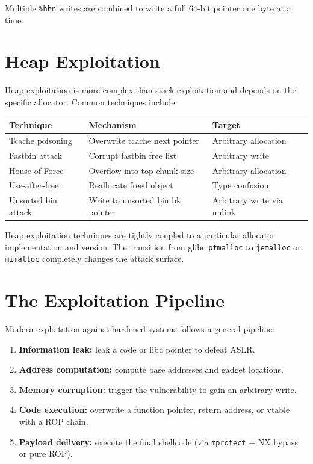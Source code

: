 Multiple \texttt{\%hhn} writes are combined to write a full 64-bit pointer one byte at a time.

\section{Heap Exploitation}

Heap exploitation is more complex than stack exploitation and depends on the specific allocator. Common techniques include:

\begin{longtable}{p{3.5cm}p{5cm}p{4cm}}
	\toprule
	\textbf{Technique}  & \textbf{Mechanism}               & \textbf{Target}            \\
	\midrule
	Tcache poisoning    & Overwrite tcache next pointer    & Arbitrary allocation       \\
	Fastbin attack      & Corrupt fastbin free list        & Arbitrary write            \\
	House of Force      & Overflow into top chunk size     & Arbitrary allocation       \\
	Use-after-free      & Reallocate freed object          & Type confusion             \\
	Unsorted bin attack & Write to unsorted bin bk pointer & Arbitrary write via unlink \\
	\bottomrule
\end{longtable}

\begin{principle}
	Heap exploitation techniques are tightly coupled to a particular allocator implementation and version. The transition from glibc \texttt{ptmalloc} to \texttt{jemalloc} or \texttt{mimalloc} completely changes the attack surface.
\end{principle}

\section{The Exploitation Pipeline}

Modern exploitation against hardened systems follows a general pipeline:

\begin{enumerate}
	\item \textbf{Information leak:} leak a code or libc pointer to defeat ASLR.
	\item \textbf{Address computation:} compute base addresses and gadget locations.
	\item \textbf{Memory corruption:} trigger the vulnerability to gain an arbitrary write.
	\item \textbf{Code execution:} overwrite a function pointer, return address, or vtable with a ROP chain.
	\item \textbf{Payload delivery:} execute the final shellcode (via \texttt{mprotect} + NX bypass or pure ROP).
\end{enumerate}

